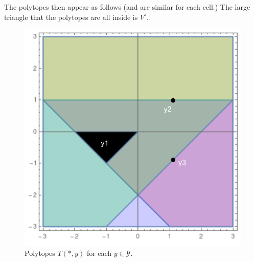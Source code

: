 \documentclass[12pt]{article}
\newcommand{\Y}{\mathcal{Y}}
\begin{document}
The polytopes then appear as follows (and are similar for each cell.)
The large triangle that the polytopes are all inside is $V^\circ$.
\begin{figure}
\centering
\includegraphics[width=0.7\linewidth]{./ranking}
\caption{Polytopes $T(*, y)$ for each $y \in \Y$.}
\label{fig:ranking}
\end{figure}
\end{document}
